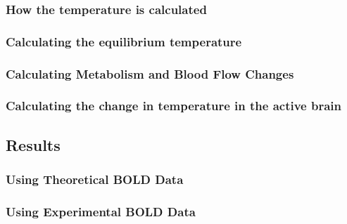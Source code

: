     \subsubsection{How the temperature is calculated}
    \subsubsection{Calculating the equilibrium temperature}
    \subsubsection{Calculating Metabolism and Blood Flow Changes}
    \subsubsection{Calculating the change in temperature in the active brain}
  \subsection{Results}
    \subsubsection{Using Theoretical BOLD Data}
    \subsubsection{Using Experimental BOLD Data}
